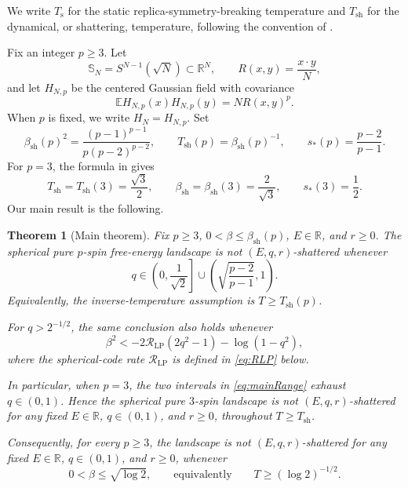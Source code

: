 \documentclass[11pt,reqno]{amsart}
\numberwithin{equation}{section}
\theoremstyle{plain}
\newtheorem{theorem}{Theorem}[section]
\theoremstyle{definition}
\theoremstyle{remark}
\newcommand{\SN}{\mathbb{S}_N}
\newcommand{\E}{\mathbb E}
\newcommand{\R}{\mathbb R}
\newcommand{\1}{\mathbf 1}
\newcommand{\bsh}{\beta_{\mathrm{sh}}}
\newcommand{\Tsh}{T_{\mathrm{sh}}}
\newcommand{\Ts}{T_{\mathrm{s}}}
\begin{document}
We write \(\Ts\) for the static replica-symmetry-breaking temperature
and \(\Tsh\) for the dynamical, or shattering, temperature, following
the convention of \cite{BenArousJagannath2024}.

Fix an integer \(p\geq3\).  Let
\[
 \SN=S^{N-1}(\sqrt N)\subset\R^N,
 \qquad
 R(x,y)=\frac{x\cdot y}{N},
\]
and let \(H_{N,p}\) be the centered Gaussian field with covariance
\begin{equation}\label{eq:covariance}
 \E H_{N,p}(x)H_{N,p}(y)=N R(x,y)^p.
\end{equation}
When \(p\) is fixed, we write \(H_N=H_{N,p}\).  Set
\begin{equation}\label{eq:generalThresholdsIntro}
 \beta_{\mathrm{sh}}(p)^2
 =\frac{(p-1)^{p-1}}{p(p-2)^{p-2}},
 \qquad
 T_{\mathrm{sh}}(p)=\beta_{\mathrm{sh}}(p)^{-1},
 \qquad
 s_*(p)=\frac{p-2}{p-1}.
\end{equation}
For \(p=3\), the formula in \cite[Section~2]{BenArousJagannath2024}
gives
\[
 \Tsh=T_{\mathrm{sh}}(3)=\frac{\sqrt3}{2},
 \qquad
 \bsh=\beta_{\mathrm{sh}}(3)=\frac{2}{\sqrt3},
 \qquad
 s_*(3)=\frac12.
\]
Our main result is the following.

\begin{theorem}[Main theorem]\label{thm:main}
Fix \(p\geq3\), \(0<\beta\leq\beta_{\mathrm{sh}}(p)\),
\(E\in\R\), and \(r\geq0\).  The spherical pure \(p\)-spin
free-energy landscape is not \((E,q,r)\)-shattered whenever
\begin{equation}\label{eq:mainRange}
 q\in\left(0,\frac1{\sqrt2}\right]
 \cup\left(\sqrt{\frac{p-2}{p-1}},1\right).
\end{equation}
Equivalently, the inverse-temperature assumption is
\(T\geq T_{\mathrm{sh}}(p)\).

For \(q>2^{-1/2}\), the same conclusion also holds whenever
\begin{equation}\label{eq:mainCodeCriterion}
 \beta^2<
 -2\mathcal R_{\mathrm{LP}}(2q^2-1)-\log(1-q^2),
\end{equation}
where the spherical-code rate \(\mathcal R_{\mathrm{LP}}\) is defined
in \eqref{eq:RLP} below.

In particular, when \(p=3\), the two intervals in
\eqref{eq:mainRange} exhaust \(q\in(0,1)\).  Hence the spherical pure
\(3\)-spin landscape is not \((E,q,r)\)-shattered for any fixed
\(E\in\R\), \(q\in(0,1)\), and \(r\geq0\), throughout
\(T\geq\Tsh\).

Consequently, for every \(p\geq3\), the landscape is not
\((E,q,r)\)-shattered for any fixed \(E\in\R\), \(q\in(0,1)\), and
\(r\geq0\), whenever
\begin{equation}\label{eq:hotAllOverlap}
 0<\beta\leq\sqrt{\log2},
 \qquad\text{equivalently}\qquad
 T\geq(\log2)^{-1/2}.
\end{equation}
\end{theorem}
\end{document}

